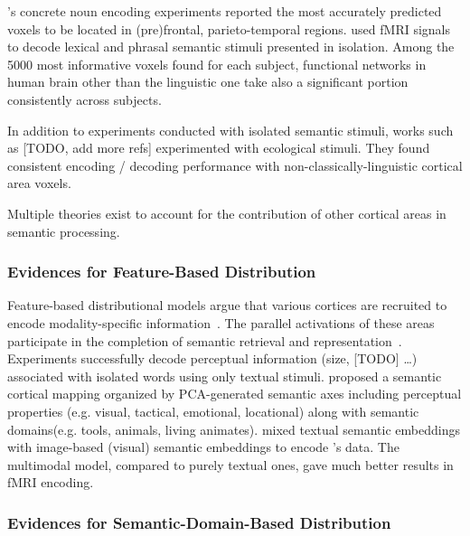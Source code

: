\textcite{mitchellPredictingHumanBrain2008}'s concrete noun encoding experiments reported the most accurately predicted voxels to be located in (pre)frontal, parieto-temporal regions. \textcite{pereiraUniversalDecoderLinguistic2018} used fMRI signals to decode lexical and phrasal semantic stimuli presented in isolation. Among the 5000 most informative voxels found for each subject, functional networks in human brain other than the linguistic one take also a significant portion consistently across subjects. 

In addition to experiments conducted with isolated semantic stimuli, works such as \textcite{todorovicAnalysesIRMfLors2018, verdierEncodageActiviteNeuronale2018} [TODO, add more refs] experimented with ecological stimuli. They found consistent encoding / decoding performance with non-classically-linguistic cortical area voxels.

Multiple theories exist to account for the contribution of other cortical areas in semantic processing.   

\subsubsection{Evidences for Feature-Based Distribution}
\label{subsec: featurebaseddistribution}
Feature-based distributional models argue that various cortices are recruited to encode modality-specific information~\parencite{chaoAttributebasedNeuralSubstrates1999, haukSomatotopicRepresentationAction2004, goldbergPerceptualKnowledgeRetrieval2006}. The parallel activations of these areas participate in the completion of semantic retrieval and representation~\parencite{pattersonWhereYouKnow2007}. Experiments \parencite{borghesaniWordMeaningVentral2016} successfully decode perceptual information (size, [TODO] \dots) associated with isolated words using only textual stimuli. \textcite{huthNaturalSpeechReveals2016} proposed a semantic cortical mapping organized by PCA-generated semantic axes including perceptual properties (e.g. visual, tactical, emotional, locational) along with semantic domains(e.g. tools, animals, living animates). \textcite{rowtulaDeepAutoencoderNearPerfect2018} mixed textual semantic embeddings with image-based (visual) semantic embeddings to encode \textcite{pereiraUniversalDecoderLinguistic2018}'s data. The multimodal model, compared to purely textual ones, gave much better results in fMRI encoding.

\subsubsection{Evidences for Semantic-Domain-Based Distribution}

